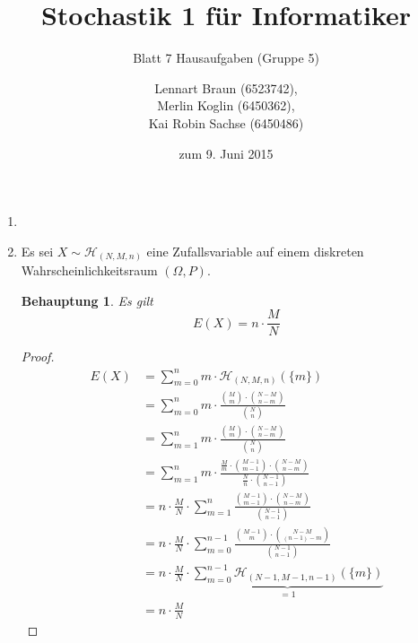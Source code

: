 \documentclass[a4paper]{scrartcl}
\title{Stochastik 1 für Informatiker}
\subtitle{Blatt 7 Hausaufgaben (Gruppe 5)}
\author{
    Lennart Braun (6523742), \\
    Merlin Koglin (6450362), \\
    Kai Robin Sachse (6450486)
}
\date{zum 9. Juni 2015}
\newtheorem*{behaupt}{Behauptung}
\begin{document}
\maketitle

\begin{enumerate}[label=\bfseries\arabic*.]
    \item

    \item
        Es sei $X \sim \mathcal{H}_{(N, M, n)}$ eine Zufallsvariable auf einem
        diskreten Wahrscheinlichkeitsraum $(\Omega, P)$.
        \begin{behaupt}
            Es gilt
            \begin{equation*}
                E(X) = n \cdot \frac{M}{N}
            \end{equation*}
        \end{behaupt}
        \begin{proof}
            \begin{equation*}
                \begin{split}
                    E(X)
                    &= \sum_{m=0}^n m \cdot \mathcal{H}_{(N, M, n)} (\{m\}) \\
                    &= \sum_{m=0}^n m \cdot
                        \frac{\binom{M}{m} \cdot \binom{N-M}{n-m}}
                             {\binom{N}{n}} \\
                    &= \sum_{m=1}^n m \cdot
                        \frac{\binom{M}{m} \cdot \binom{N-M}{n-m}}
                             {\binom{N}{n}} \\
                    &= \sum_{m=1}^n m \cdot
                        \frac{\frac{M}{m} \cdot \binom{M-1}{m-1} \cdot
                        \binom{N-M}{n-m}}{\frac{N}{n} \cdot \binom{N-1}{n-1}} \\
                    &= n \cdot \frac{M}{N} \cdot \sum_{m=1}^n
                        \frac{\binom{M-1}{m-1} \cdot
                        \binom{N-M}{n-m}}{\binom{N-1}{n-1}} \\
                    &= n \cdot \frac{M}{N} \cdot \sum_{m=0}^{n-1}
                        \frac{\binom{M-1}{m} \cdot
                        \binom{N-M}{(n-1) -m}}{\binom{N-1}{n-1}} \\
                    &= n \cdot \frac{M}{N} \cdot \underbrace{\sum_{m=0}^{n-1}
                        \mathcal{H}_{(N-1, M-1, n-1)}(\{m\})}_{= 1} \\
                    &= n \cdot \frac{M}{N}
                \end{split}
            \end{equation*}
        \end{proof}


\end{enumerate}
\end{document}
